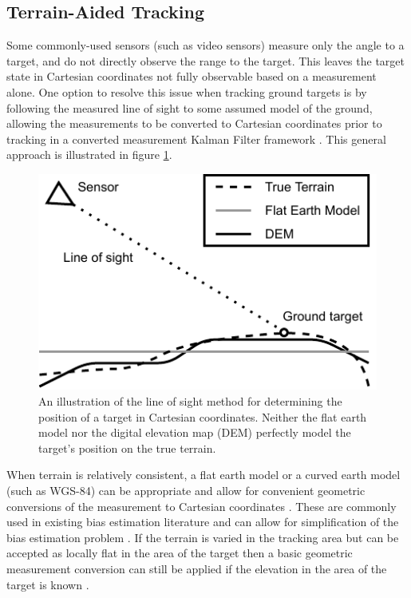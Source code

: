 \documentclass[journal]{IEEEtran}
\begin{document}
\subsection{Terrain-Aided Tracking} \label{terrainaidedtracking}
Some commonly-used sensors (such as video sensors) measure only the angle to a target, and do not directly observe the range to the target. This leaves the target state in Cartesian coordinates not fully observable based on a measurement alone. One option to resolve this issue when tracking ground targets is by following the measured line of sight to some assumed model of the ground, allowing the measurements to be converted to Cartesian coordinates prior to tracking in a converted measurement Kalman Filter framework \cite{barber2006vision, kim2009terrain}. This general approach is illustrated in figure \ref{fig:lostracking}.

\begin{figure}[ht]
    \centering
    \includegraphics[scale=1.0]{TerrainTrackingDiagram.pdf}
    \caption{An illustration of the line of sight method for determining the position of a target in Cartesian coordinates. Neither the flat earth model nor the digital elevation map (DEM) perfectly model the target's position on the true terrain.}
    \label{fig:lostracking}
\end{figure}

When terrain is relatively consistent, a flat earth model or a curved earth model (such as WGS-84) can be appropriate and allow for convenient geometric conversions of the measurement to Cartesian coordinates \cite{barber2006vision}. These are commonly used in existing bias estimation literature and can allow for simplification of the bias estimation problem \cite{taghavi2016practical, song2021efficient}. If the terrain is varied in the tracking area but can be accepted as locally flat in the area of the target then a basic geometric measurement conversion can still be applied if the elevation in the area of the target is known \cite{song2021efficient}.
\end{document}

